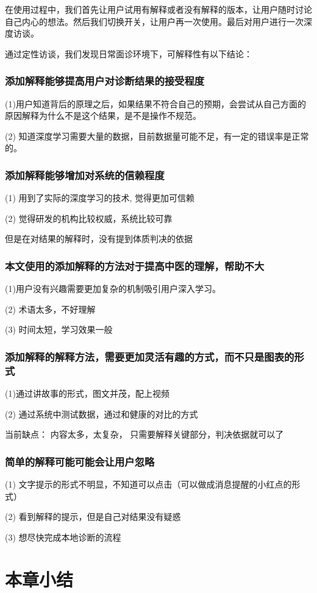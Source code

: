 在使用过程中，我们首先让用户试用有解释或者没有解释的版本，让用户随时讨论自己内心的想法。然后我们切换开关，让用户再一次使用。最后对用户进行一次深度访谈。

通过定性访谈，我们发现日常面诊环境下，可解释性有以下结论：

\subsubsection{添加解释能够提高用户对诊断结果的接受程度}

(1)用户知道背后的原理之后，如果结果不符合自己的预期，会尝试从自己方面的原因解释为什么不是这个结果，是不是操作不规范。

(2) 知道深度学习需要大量的数据，目前数据量可能不足，有一定的错误率是正常的。

\subsubsection{添加解释能够增加对系统的信赖程度}

(1) 用到了实际的深度学习的技术, 觉得更加可信赖

(2) 觉得研发的机构比较权威，系统比较可靠

但是在对结果的解释时，没有提到体质判决的依据

\subsubsection{本文使用的添加解释的方法对于提高中医的理解，帮助不大}
(1)用户没有兴趣需要更加复杂的机制吸引用户深入学习。

(2) 术语太多，不好理解

(3) 时间太短，学习效果一般

\subsubsection{添加解释的解释方法，需要更加灵活有趣的方式，而不只是图表的形式}
(1)通过讲故事的形式，图文并茂，配上视频

(2) 通过系统中测试数据，通过和健康的对比的方式

当前缺点： 内容太多，太复杂， 只需要解释关键部分，判决依据就可以了

\subsubsection{简单的解释可能可能会让用户忽略}
(1) 文字提示的形式不明显，不知道可以点击（可以做成消息提醒的小红点的形式）

(2) 看到解释的提示，但是自己对结果没有疑惑

(3) 想尽快完成本地诊断的流程


\section{本章小结}



